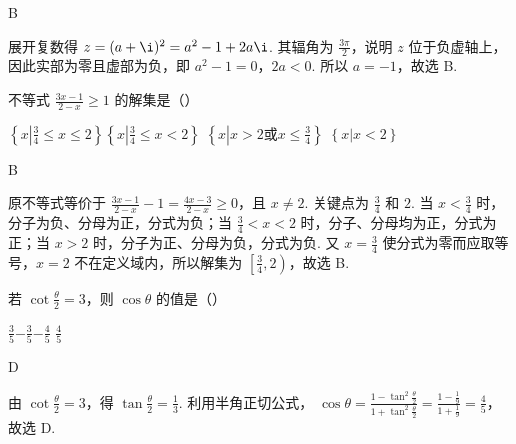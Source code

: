\begin{answer}
B
\end{answer}

\begin{solution}
展开复数得 \(z=(a+\i)^{2}=a^{2}-1+2a\i\). 其辐角为 \(\frac{3\pi}{2}\)，说明 \(z\) 位于负虚轴上，因此实部为零且虚部为负，即 \(a^{2}-1=0\)，\(2a<0\). 所以 \(a=-1\)，故选 B.
\end{solution}

\begin{problem}

不等式 \(\frac{3x-1}{2-x} \geqslant 1 \) 的解集是（\quad）

\choices
{\(\left\{x\left|\frac{3}{4}\leqslant x\leqslant2\right.\right\} \)}{\(\left\{x\left|\frac{3}{4}\leqslant x<2\right.\right\} \)}
{\(\left\{x\left|x>2 \text{或} x\leqslant\frac{3}
{4}\right.\right\} \)}
{\(\left\{x\left|x<2\right.\right\} \)}
\end{problem}

\begin{answer}
B
\end{answer}

\begin{solution}
原不等式等价于
\(\frac{3x-1}{2-x}-1=\frac{4x-3}{2-x}\geqslant0\)，且 \(x\neq2\). 关键点为 \(\frac{3}{4}\) 和 \(2\). 当 \(x<\frac{3}{4}\) 时，分子为负、分母为正，分式为负；当 \(\frac{3}{4}<x<2\) 时，分子、分母均为正，分式为正；当 \(x>2\) 时，分子为正、分母为负，分式为负. 又 \(x=\frac{3}{4}\) 使分式为零而应取等号，\(x=2\) 不在定义域内，所以解集为 \(\left[\frac{3}{4},2\right)\)，故选 B.
\end{solution}

\begin{problem}

若 \(\cot\frac{\theta}{2}=3 \)，则 \(\cos\theta \) 的值是（\quad）

\choices
{\(\frac{3}{5}\)}{\(-\frac{3}{5}\)}{\(-\frac{4}
{5}\)}
{\(\frac{4}
{5}\)}
\end{problem}

\begin{answer}
D
\end{answer}

\begin{solution}
由 \(\cot\frac{\theta}{2}=3\)，得 \(\tan\frac{\theta}{2}=\frac{1}{3}\). 利用半角正切公式，
\(\cos\theta=\frac{1-\tan^{2}\frac{\theta}{2}}{1+\tan^{2}\frac{\theta}{2}}=\frac{1-\frac{1}{9}}{1+\frac{1}{9}}=\frac{4}{5}\)，故选 D.
\end{solution}

